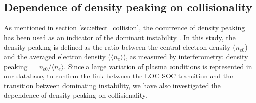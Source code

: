 \subsection{Dependence of density peaking on collisionality}

As mentioned in section \ref{sec:effect_collision}, the occurrence of density peaking has been used as an indicator of the dominant instability \cite{Angioni_PoP_2005_LOCSOC_TEMITG}. In this study, the density peaking is defined as the ratio between the central electron density ($n_{e0}$) and the averaged electron density ($\langle n_e \rangle$), as measured by interferometry: density peaking $= n_{e0}/\langle n_e \rangle$. Since a large variation of plasma conditions is represented in our database, to confirm the link between the LOC-SOC transition and the transition between dominating instability, we have also investigated the dependence of density peaking on collisionality.


%
%


